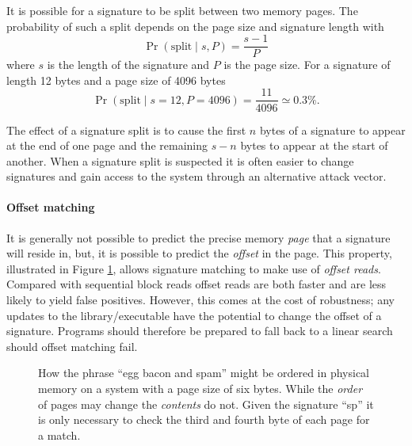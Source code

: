 \documentclass[numbers=noenddot,      %
               abstract,              %
               captions=tableheading, %
               DIV=8]                 %
              {scrartcl}
\begin{document}
It is possible for a signature to be split between two memory pages. The
probability of such a split depends on the page size and signature
length with
\[
  \Pr(\textrm{split} \mid s,P) = \frac{s-1}{P}
\]
where $s$ is the length of the signature and $P$ is the page size. For a
signature of length 12 bytes and a page size of 4096 bytes
\[
  \Pr(\textrm{split} \mid s=12,P=4096) = \frac{11}{4096} \simeq 0.3\%.
\]

The effect of a signature split is to cause the first $n$ bytes of a
signature to appear at the end of one page and the remaining $s-n$ bytes
to appear at the start of another. When a signature split is suspected
it is often easier to change signatures and gain access to the system
through an alternative attack vector.

\paragraph{Offset matching}
It is generally not possible to predict the precise memory \emph{page}
that a signature will reside in, but, it is possible to predict the
\emph{offset} in the page. This property, illustrated in Figure
\ref{fig:pageoff}, allows signature matching to make use of \emph{offset
  reads}. Compared with sequential block reads offset reads are both
faster and are less likely to yield false positives. However, this comes
at the cost of robustness; any updates to the library/executable have
the potential to change the offset of a signature. Programs should
therefore be prepared to fall back to a linear search should offset
matching fail.

\begin{figure}
  \centering
  \caption{\label{fig:pageoff}How the phrase ``egg bacon and spam''
    might be ordered in physical memory on a system with a page size of
    six bytes. While the \emph{order} of pages may change the
    \emph{contents} do not. Given the signature ``sp'' it is only
    necessary to check the third and fourth byte of each page for a
    match.}
\end{figure}
\end{document}
